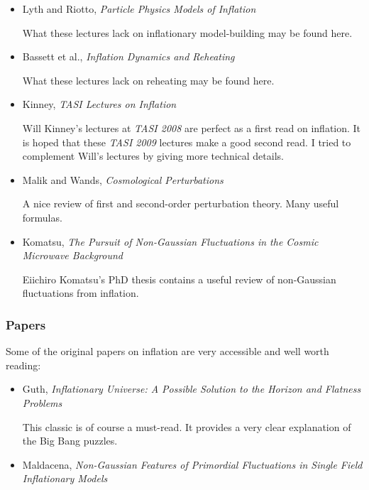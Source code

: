 \documentclass[12pt,letterpaper,rotate]{article}
\begin{document}
{\begin{itemize}
In this review Liam McAllister and I describe the challenge of realizing inflation in string theory.

\item Lyth and Riotto, {\it Particle Physics Models of Inflation}

What these lectures lack on inflationary model-building may be found here.

\item Bassett et al., {\it Inflation Dynamics and Reheating}

What these lectures lack on reheating may be found here.

\item Kinney, {\it TASI Lectures on Inflation}

Will Kinney's lectures at {\sl TASI 2008} are
perfect as a first read on inflation.
It is hoped that these {\sl TASI 2009} lectures make a good second read.
I tried to complement Will's lectures by giving more technical details.

\item Malik and Wands, {\it Cosmological Perturbations}

A nice review of first and second-order perturbation theory. Many useful formulas.


\item Komatsu, {\it The Pursuit of Non-Gaussian Fluctuations in the Cosmic Microwave Background}

Eiichiro Komatsu's PhD thesis contains a useful review of non-Gaussian fluctuations from inflation.
\end{itemize}



\subsubsection*{Papers}

Some of the original papers on inflation are very accessible and well worth reading:

\begin{itemize}
\item Guth, {\it Inflationary Universe: A Possible Solution to the Horizon and Flatness Problems}

{\small This classic is of course a must-read. It provides a very clear explanation of the Big Bang puzzles.}

\item Maldacena, {\it Non-Gaussian Features of Primordial Fluctuations in Single Field Inflationary Models}


\end{itemize}}
\end{document}

